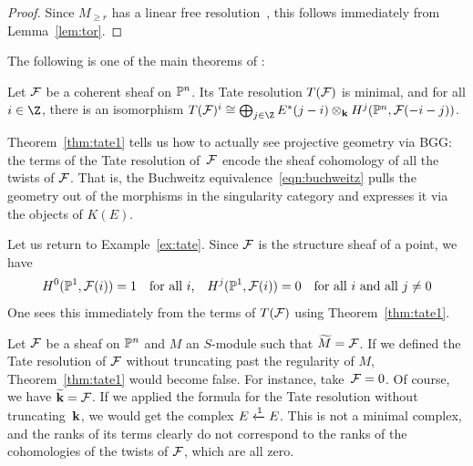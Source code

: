 \documentclass{amsart}
\begin{document}
\begin{proof}
Since $M_{\ge r}$ has a linear free resolution~\cite{EG84}, this follows immediately from Lemma~\ref{lem:tor}.
\end{proof}

 The following is one of the main theorems of \cite{EFS03}:






\begin{thm}
\label{thm:tate1}
Let $\mathcal{F}$ be a coherent sheaf on $\mathbb P^n$. Its Tate resolution $T(\mathcal{F})$ is minimal, and for all $i \in \Z$, there is an isomorphism $T(\F)^i \cong \bigoplus_{j \in \Z} E^*(j-i) \otimes_\k H^j(\PP^n, \F(-i -j))$.
\end{thm}

Theorem~\ref{thm:tate1} tells us how to actually see projective geometry via BGG: the terms of the Tate resolution of~$\mathcal{F}$ encode the sheaf cohomology of all the twists of $\mathcal{F}$. That is, the Buchweitz equivalence~\eqref{eqn:buchweitz} pulls the geometry out of the morphisms in the singularity category and expresses  it via the objects of $K(E)$.

\begin{example}
Let us return to Example~\ref{ex:tate}. Since $\mathcal{F}$ is the structure sheaf of a point, we have
$$
H^0(\mathbb P^1, \mathcal{F}(i)) = 1 \quad \text{for all $i$,} \quad H^j(\mathbb P^1, \mathcal{F}(i)) = 0 \quad \text{for all $i$ and all $j \ne 0$}
$$
One sees this immediately from the terms of $T(\mathcal{F})$ using Theorem~\ref{thm:tate1}.
\end{example}

\begin{remark}
\label{rem:truncation}
Let $\mathcal{F}$ be a sheaf on $\mathbb P^n$ and $M$ an $S$-module such that $\widetilde{M} = \mathcal{F}$. If we defined the Tate resolution of $\mathcal{F}$ without truncating past the regularity of $M$, Theorem~\ref{thm:tate1} would become false. For instance, take~$\mathcal{F} = 0$. Of course, we have $\widetilde{\mathbf{k}} = \mathcal{F}$. If we applied the formula for the Tate resolution without truncating~$\mathbf{k}$, we would get the complex $E \xleftarrow{1} E$. This is not a minimal complex, and the ranks of its terms clearly do not correspond to the ranks of the cohomologies of the twists of $\mathcal{F}$, which are all zero.
\end{remark}
\end{document}
